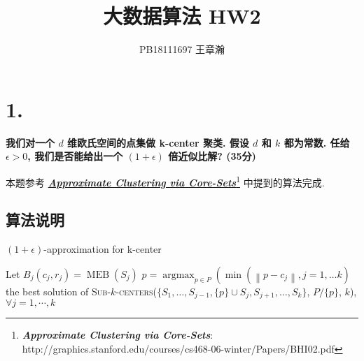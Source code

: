 \documentclass[UTF8]{article}
\title{大数据算法 HW2}
\author{PB18111697 王章瀚}
\newcommand{\jumpLine} {\hspace*{\fill} \par}
\begin{document}
\maketitle
\section*{1.}

\noindent \textbf{我们对一个 $d$ 维欧氏空间的点集做 k-center 聚类. 假设 $d$ 和 $k$ 都为常数. 任给 $\epsilon > 0$, 我们是否能给出一个 $(1 + \epsilon)$ 倍近似比解? (35分)} \\\jumpLine\noindent
\noindent
本题参考 \href{http://graphics.stanford.edu/courses/cs468-06-winter/Papers/BHI02.pdf}{\textbf{\textit{Approximate Clustering via Core-Sets}}}\footnote{\textbf{\textit{Approximate Clustering via Core-Sets}}: http://graphics.stanford.edu/courses/cs468-06-winter/Papers/BHI02.pdf}
中提到的算法完成.

\subsection*{算法说明}
\noindent
\begin{algorithm}[H]
	\caption{
		$(1+\epsilon)$-approximation for k-center
	}  
	\begin{algorithmic}[1] %
		\State Let $B_j(c_j, r_j) =\operatorname{MEB}(S_j)$
		\EndFor
		\State $
		p=\operatorname{argmax}_{p \in P}\left(\min \left(\left\|p-c_{j}\right\|, j=1,\ldots k\right)\right.
		$
		\State \Return the best solution of \textsc{Sub-$k$-centers}($\{S_1,\ldots,S_{j-1},\{p\}\cup S_j,S_{j+1},\ldots,S_k\}$, $P/\{p\}$, $k$), $\forall j = 1,\cdots, k$
		\EndFor
		\EndFunction
	\end{algorithmic}
\end{algorithm}
\end{document}
